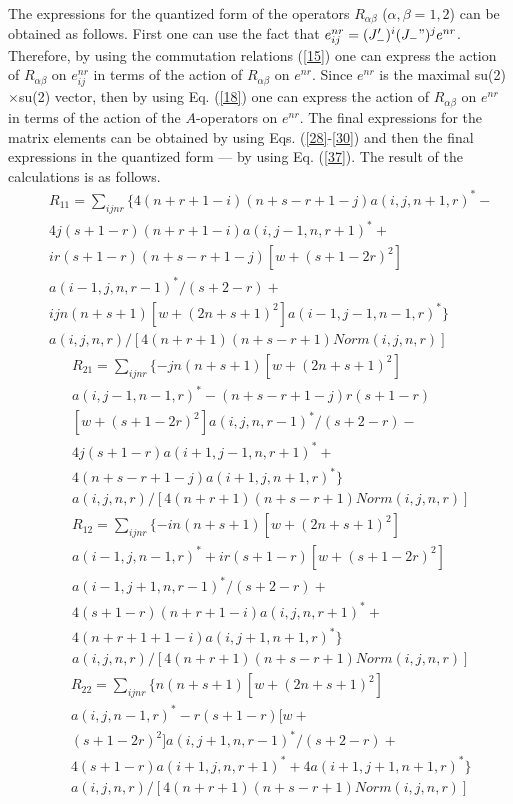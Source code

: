\documentclass[a4paper,12pt]{article}%
\begin{document}
The expressions for the quantized form of the
operators $R_{\alpha\beta}$ ($\alpha,\beta =1,2$) can
be obtained as follows. First one can use the fact that
$e^{nr}_{ij}=(J_-')^i(J_-")^je^{nr}$. Therefore, by using
the commutation relations (\ref{15}) one can express the
action of $R_{\alpha\beta}$ on $e^{nr}_{ij}$ in terms of
the action of $R_{\alpha\beta}$ on $e^{nr}$. Since $e^{nr}$
is the maximal su(2)$\times$su(2) vector, then by using 
Eq. (\ref{18}) one can express the action of 
$R_{\alpha\beta}$ on $e^{nr}$ in terms of the action
of the $A$-operators on $e^{nr}$. The final expressions
for the matrix elements can be obtained by using 
Eqs. (\ref{28}-\ref{30}) and then the final expressions
in the quantized form --- by using Eq. 
(\ref{37}). The result of the calculations is as follows.
\begin{eqnarray}
&&R_{11}=\sum_{ijnr} \{4(n+r+1-i)(n+s-r+1-j)
a(i,j,n+1,r)^*-\nonumber\\
&&4j(s+1-r)(n+r+1-i)a(i,j-1,n,r+1)^*+\nonumber\\
&&ir(s+1-r)(n+s-r+1-j)[w+(s+1-2r)^2]\nonumber\\
&&a(i-1,j,n,r-1)^*/(s+2-r) +\nonumber\\ 
&&ijn(n+s+1)[w+(2n+s+1)^2]a(i-1,j-1,n-1,r)^*\}\nonumber\\
&&a(i,j,n,r)/[4(n+r+1)(n+s-r+1)Norm(i,j,n,r)]
\label{44}
\end{eqnarray}
\begin{eqnarray}
&&R_{21}=\sum_{ijnr} \{-jn(n+s+1)[w+(2n+s+1)^2]\nonumber\\
&&a(i,j-1,n-1,r)^*-(n+s-r+1-j)r(s+1-r)\nonumber\\
&&[w+(s+1-2r)^2]a(i,j,n,r-1)^*/(s+2-r)-\nonumber\\
&&4j(s+1-r)a(i+1,j-1,n,r+1)^*+\nonumber\\
&&4(n+s-r+1-j)a(i+1,j,n+1,r)^*\}\nonumber\\
&&a(i,j,n,r)/[4(n+r+1)(n+s-r+1)Norm(i,j,n,r)]
\label{45}
\end{eqnarray}
\begin{eqnarray}
&&R_{12}=\sum_{ijnr}\{-in(n+s+1)[w+(2n+s+1)^2]\nonumber\\
&&a(i-1,j,n-1,r)^*+ir(s+1-r)[w+(s+1-2r)^2]\nonumber\\
&&a(i-1,j+1,n,r-1)^*/(s+2-r)+\nonumber\\
&&4(s+1-r)(n+r+1-i)a(i,j,n,r+1)^*+\nonumber\\
&&4(n+r+1+1-i)a(i,j+1,n+1,r)^*\}\nonumber\\
&&a(i,j,n,r)/[4(n+r+1)(n+s-r+1)Norm(i,j,n,r)]
\label{46}
\end{eqnarray}
\begin{eqnarray}
&&R_{22}=\sum_{ijnr}\{n(n+s+1)[w+(2n+s+1)^2]\nonumber\\
&&a(i,j,n-1,r)^*-r(s+1-r)[w+\nonumber\\
&&(s+1-2r)^2]a(i,j+1,n,r-1)^*/(s+2-r)+\nonumber\\
&&4(s+1-r)a(i+1,j,n,r+1)^*+4a(i+1,j+1,n+1,r)^*\}\nonumber\\
&&a(i,j,n,r)/[4(n+r+1)(n+s-r+1)Norm(i,j,n,r)]
\label{47}
\end{eqnarray}
\end{document}

